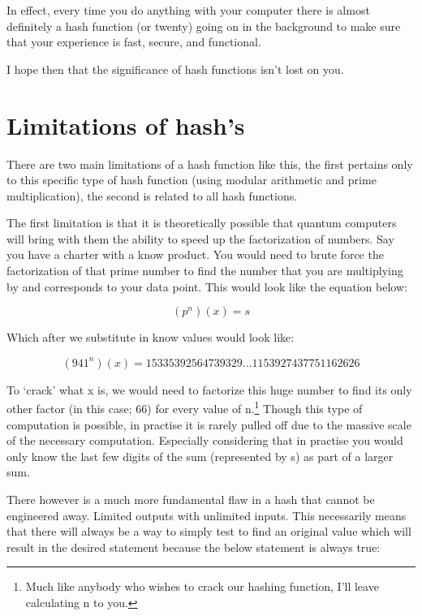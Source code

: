 \documentclass[11pt, oneside]{article}   	%
\begin{document}
In effect, every time you do anything with your computer there is almost definitely a hash function (or twenty) going on in the background to make sure that your experience is fast, secure, and functional.

I hope then that the significance of hash functions isn’t lost on you.

\section{Limitations of hash’s}

There are two main limitations of a hash function like this, the first pertains only to this specific type of hash function (using modular arithmetic and prime multiplication), the second is related to all hash functions.

The first limitation is that it is theoretically possible that quantum computers will bring with them the ability to speed up the factorization of numbers. Say you have a charter with a know product. You would need to brute force the factorization of that prime number to find the number that you are multiplying by and corresponds to your data point. This would look like the equation below:

\begin{equation}
    (p^n)(x) = s
\end{equation}

Which after we substitute in know values would look like:

\begin{equation}
    (941^n)(x) = 15335392564739329...1153927437751162626
\end{equation}

To ‘crack’ what x is, we would need to factorize this huge number to find its only other factor (in this case; 66) for every value of n.\footnote{Much like anybody who wishes to crack our hashing function, I’ll leave calculating n to you.} Though this type of computation is possible, in practise it is rarely pulled off due to the massive scale of the necessary computation. Especially considering that in practise you would only know the last few digits of the sum (represented by s) as part of a larger sum.

There however is a much more fundamental flaw in a hash that cannot be engineered away. Limited outputs with unlimited inputs. This necessarily means that there will always be a way to simply test to find an original value which will result in the desired statement because the below statement is always true:
\end{document}
